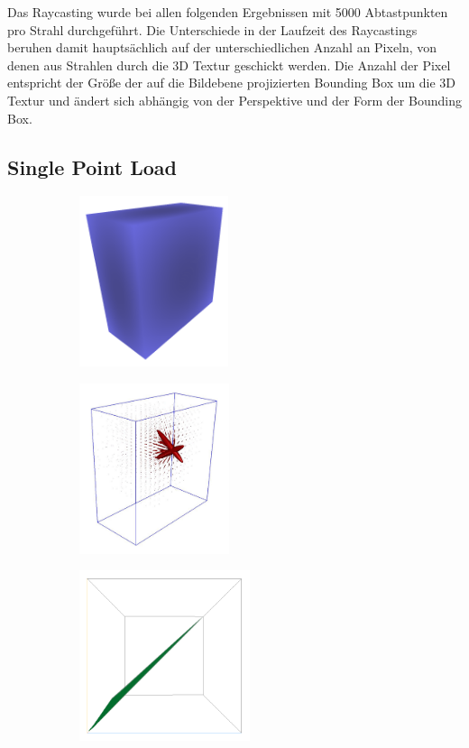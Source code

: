 \documentclass[a4paper,fontsize=12pt,toc=bib,parskip=half,ngerman]{scrartcl}
\begin{document}
Das Raycasting wurde bei allen folgenden Ergebnissen mit 5000 Abtastpunkten pro Strahl durchgef\"uhrt. Die Unterschiede in der Laufzeit des Raycastings beruhen damit haupts\"achlich auf der unterschiedlichen Anzahl an Pixeln, von denen aus Strahlen durch die 3D Textur geschickt werden. Die Anzahl der Pixel entspricht der Gr\"o{\ss}e der auf die Bildebene projizierten Bounding Box um die 3D Textur und \"andert sich abh\"angig von der Perspektive und der Form der Bounding Box.


\subsection{Single Point Load}

\begin{figure}
		\begin{subfigure}{0.28\textwidth}
		\centering
		\includegraphics[height=5cm]{pictures/results/SinglePoint/SinglePoint_Object.png}
		\subcaption{}
		\label{SinglePointObject}
	\end{subfigure}
	\hspace*{\fill}
	\begin{subfigure}{0.28\textwidth}
		\centering
		\includegraphics[height=5cm]{pictures/results/SinglePoint/SinglePoint_Ellipsoids.png}
		\subcaption{}
		\label{SinglePointEllipsoids}
	\end{subfigure}
	\hspace*{\fill}
	\begin{subfigure}{0.34\textwidth}
		\centering
		\includegraphics[height=5cm]{pictures/results/SinglePoint/SinglePoint_InvariantSpace.png}

\end{subfigure}
\end{figure}
\end{document}
